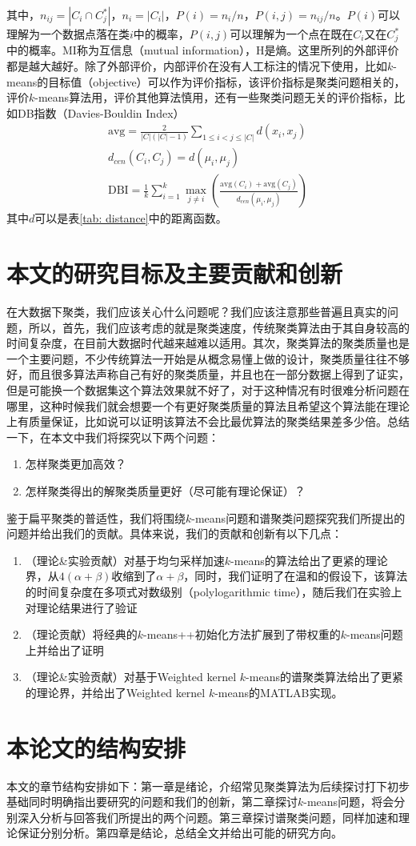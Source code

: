 其中，$n_{ij}=|C_i \cap C_j^*|$，$n_i = |C_i|$，$P(i) = n_i/n$，$P(i,j)=n_{ij}/n$。$P(i)$可以理解为一个数据点落在类$i$中的概率，$P(i,j)$可以理解为一个点在既在$C_i$又在$C_j^*$中的概率。MI称为互信息（mutual information），H是熵。这里所列的外部评价都是越大越好。除了外部评价，内部评价在没有人工标注的情况下使用，比如$k$-means的目标值（objective）可以作为评价指标，该评价指标是聚类问题相关的，评价$k$-means算法用，评价其他算法慎用，还有一些聚类问题无关的评价指标，比如DB指数（Davies-Bouldin Index）
\begin{gather}
    \text{avg} = \frac{2}{|C|(|C|-1)}\sum_{1\leq i<j \leq |C| }d(x_i,x_j) \\
    d_{cen}(C_i,C_j) = d(\mu_i,\mu_j) \\
    \text{DBI} = \frac{1}{k}\sum_{i=1}^k \max_{j \neq i} (\frac{\text{avg}(C_i)+\text{avg}(C_j)}{d_{cen}(\mu_i,\mu_j)})
\end{gather}
其中$d$可以是表\ref{tab: distance}中的距离函数。

\section{本文的研究目标及主要贡献和创新}
在大数据下聚类，我们应该关心什么问题呢？我们应该注意那些普遍且真实的问题，所以，首先，我们应该考虑的就是聚类速度，传统聚类算法由于其自身较高的时间复杂度，在目前大数据时代越来越难以适用。其次，聚类算法的聚类质量也是一个主要问题，不少传统算法一开始是从概念易懂上做的设计，聚类质量往往不够好，而且很多算法声称自己有好的聚类质量，并且也在一部分数据上得到了证实，但是可能换一个数据集这个算法效果就不好了，对于这种情况有时很难分析问题在哪里，这种时候我们就会想要一个有更好聚类质量的算法且希望这个算法能在理论上有质量保证，比如说可以证明该算法不会比最优算法的聚类结果差多少倍。总结一下，在本文中我们将探究以下两个问题：
\begin{enumerate}
    \item 怎样聚类更加高效？
    \item 怎样聚类得出的解聚类质量更好（尽可能有理论保证）？
\end{enumerate}
鉴于扁平聚类的普适性，我们将围绕$k$-means问题和谱聚类问题探究我们所提出的问题并给出我们的贡献。具体来说，我们的贡献和创新有以下几点：
\begin{enumerate}
    \item （理论\&实验贡献）对基于均匀采样加速$k$-means的算法给出了更紧的理论界，从$4(\alpha+\beta)$收缩到了$\alpha+\beta$，同时，我们证明了在温和的假设下，该算法的时间复杂度在多项式对数级别（polylogarithmic time），随后我们在实验上对理论结果进行了验证
    \item （理论贡献）将经典的$k$-means++初始化方法扩展到了带权重的$k$-means问题上并给出了证明
    \item （理论\&实验贡献）对基于Weighted kernel $k$-means的谱聚类算法给出了更紧的理论界，并给出了Weighted kernel $k$-means的MATLAB实现。
\end{enumerate}

\section{本论文的结构安排}
本文的章节结构安排如下：第一章是绪论，介绍常见聚类算法为后续探讨打下初步基础同时明确指出要研究的问题和我们的创新，第二章探讨$k$-means问题，将会分别深入分析与回答我们所提出的两个问题。第三章探讨谱聚类问题，同样加速和理论保证分别分析。第四章是结论，总结全文并给出可能的研究方向。